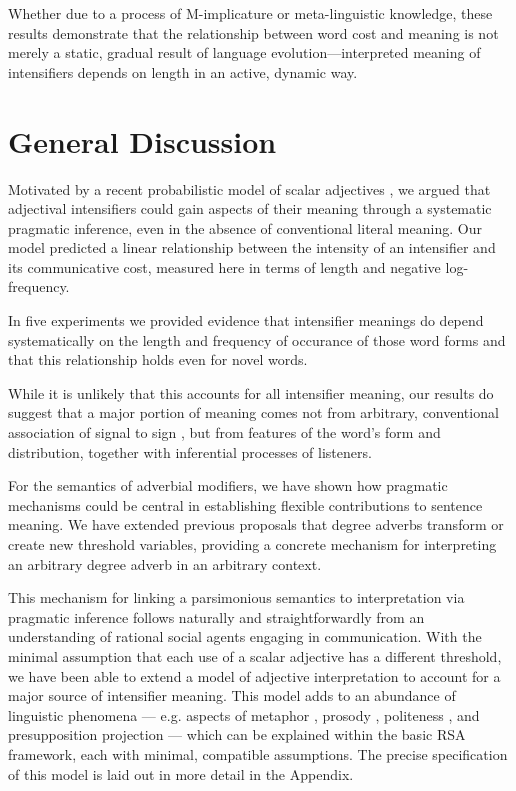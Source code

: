 \documentclass[10pt,letterpaper]{article}
\begin{document}
Whether due to a process of M-implicature or meta-linguistic knowledge, these results demonstrate that the relationship between word cost and meaning is not merely a static, gradual result of language evolution---interpreted meaning of intensifiers depends on length in an active, dynamic way.

\section{General Discussion}

Motivated by a recent probabilistic model of scalar adjectives \cite{lassiter_context_2013}, we argued that adjectival intensifiers could gain aspects of their meaning through a systematic pragmatic inference, even in the absence of conventional literal meaning.
Our model predicted a linear relationship between the intensity of an intensifier and its communicative cost, measured here in terms of length and negative log-frequency.

In five experiments we provided evidence that intensifier meanings do depend systematically on the length and frequency of occurance of those word forms and that this relationship holds even for novel words.

While it is unlikely that this accounts for all intensifier meaning, our results do suggest that a major portion of meaning comes not from arbitrary, conventional association of signal to sign \cite{de_saussure_nature_1916}, but from features of the word's form and distribution, together with inferential processes of listeners.

For the semantics of adverbial modifiers, we have shown how pragmatic mechanisms could be central in establishing flexible contributions to sentence meaning.
We have extended previous proposals that degree adverbs transform or create new threshold variables, providing a concrete mechanism for interpreting an arbitrary degree adverb in an arbitrary context.

This mechanism for linking a parsimonious semantics to interpretation via pragmatic inference follows naturally and straightforwardly from an understanding of rational social agents engaging in communication.
With the minimal assumption that each use of a scalar adjective has a different threshold, we have been able to extend a model of adjective interpretation to account for a major source of intensifier meaning.
This model adds to an abundance of linguistic phenomena --- e.g. aspects of metaphor \cite{kao_formalizing_2014}, prosody \cite{bergen_strategic_2015}, politeness \cite{yoon_i_2017}, and presupposition projection \cite{qing_rational_2016} --- which can be explained within the basic RSA framework, each with minimal, compatible assumptions.
The precise specification of this model is laid out in more detail in the Appendix.
\end{document}
